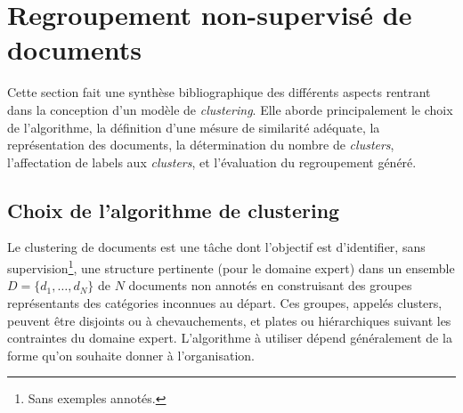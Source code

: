 
\section{Regroupement non-supervisé de documents}
\label{sec:similarite:biblio}

Cette section fait une synthèse bibliographique des différents aspects rentrant dans la conception d'un modèle de \textit{clustering}. Elle aborde principalement le choix de l'algorithme, la définition d'une mésure de similarité adéquate, la représentation des documents, la détermination du nombre de \textit{clusters}, l'affectation de labels aux \textit{clusters}, et l'évaluation du regroupement généré.

\subsection{Choix de l’algorithme de clustering}

Le clustering de documents est une tâche dont l'objectif est d'identifier, sans supervision\footnote{Sans exemples annotés.}, une structure pertinente (pour le domaine expert) dans un ensemble $D = \lbrace d_1, \dots, d_N \rbrace$ de $N$ documents non annotés en construisant des groupes représentants des catégories inconnues au départ. Ces groupes, appelés clusters, peuvent être disjoints ou à chevauchements, et plates ou hiérarchiques suivant les contraintes du domaine expert. L’algorithme à utiliser dépend généralement de la forme qu’on souhaite donner à l’organisation. 
